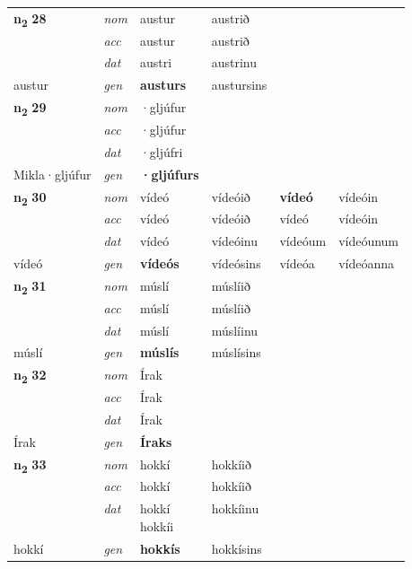 \begin{longtable}[l]{X>{\footnotesize\itshape}XXXXX}
\multirow{3}{*}{{{\textbf{n{\textsubscript{2}}} \Large{\textbf{28}}}}} & nom & austur & austrið & \textbf{} &  \\*
 & acc & austur & austrið &  &  \\*
 & dat & austri & austrinu &  &  \\*
 {\footnotesize{austur}} & gen & \textbf{austurs} & austursins &  &  \\
\midrule

\multirow{3}{*}{{{\textbf{n{\textsubscript{2}}} \Large{\textbf{29}}}}} & nom & ·gljúfur &  & \textbf{} &  \\*
 & acc & ·gljúfur &  &  &  \\*
 & dat & ·gljúfri &  &  &  \\*
 {\footnotesize{Mikla\allowbreak ·gljúfur}} & gen & \textbf{·gljúfurs} &  &  &  \\
\midrule

\multirow{3}{*}{{{\textbf{n{\textsubscript{2}}} \Large{\textbf{30}}}}} & nom & vídeó & vídeóið & \textbf{vídeó} & vídeóin \\*
 & acc & vídeó & vídeóið & vídeó & vídeóin \\*
 & dat & vídeó & vídeóinu & vídeóum & vídeóunum \\*
 {\footnotesize{vídeó}} & gen & \textbf{vídeós} & vídeósins & vídeóa & vídeóanna \\
\midrule

\multirow{3}{*}{{{\textbf{n{\textsubscript{2}}} \Large{\textbf{31}}}}} & nom & múslí & múslíið & \textbf{} &  \\*
 & acc & múslí & múslíið &  &  \\*
 & dat & múslí & múslíinu &  &  \\*
 {\footnotesize{múslí}} & gen & \textbf{múslís} & múslísins &  &  \\
\midrule

\multirow{3}{*}{{{\textbf{n{\textsubscript{2}}} \Large{\textbf{32}}}}} & nom & Írak &  & \textbf{} &  \\*
 & acc & Írak &  &  &  \\*
 & dat & Írak &  &  &  \\*
 {\footnotesize{Írak}} & gen & \textbf{Íraks} &  &  &  \\
\midrule

\multirow{3}{*}{{{\textbf{n{\textsubscript{2}}} \Large{\textbf{33}}}}} & nom & hokkí & hokkíið & \textbf{} &  \\*
 & acc & hokkí & hokkíið &  &  \\*
 & dat & \specialcell{hokkí\\ hokkíi} & hokkíinu &  &  \\*
 {\footnotesize{hokkí}} & gen & \textbf{hokkís} & hokkísins &  &  \\
\midrule


\end{longtable}
